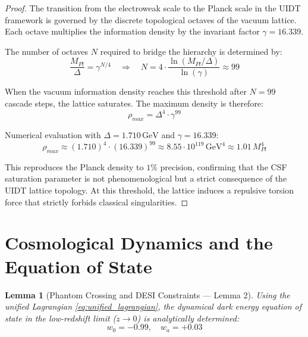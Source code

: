 \documentclass[12pt,a4paper,twoside]{article}
\theoremstyle{plain}
\newtheorem{lemma}[theorem]{Lemma}
\theoremstyle{definition}
\theoremstyle{remark}
\newcommand{\UIDT}{\textsc{UIDT}}
\newcommand{\CSF}{\textsc{CSF}}
\newcommand{\GeV}{\,\mathrm{GeV}}
\begin{document}
\begin{proof}
The transition from the electroweak scale to the Planck scale in the
\UIDT{} framework is governed by the discrete topological octaves of the
vacuum lattice. Each octave multiplies the information density by the
invariant factor $\gamma = 16.339$.

The number of octaves $N$ required to bridge the hierarchy is determined by:
\begin{equation}
    \frac{M_{Pl}}{\Delta} = \gamma^{N/4}
    \quad \Longrightarrow \quad
    N = 4 \cdot \frac{\ln(M_{Pl}/\Delta)}{\ln(\gamma)}
    \approx 99
\end{equation}

When the vacuum information density reaches this threshold after $N = 99$
cascade steps, the lattice saturates. The maximum density is therefore:
\begin{equation}
    \rho_{max} = \Delta^4 \cdot \gamma^{99}
\end{equation}

Numerical evaluation with $\Delta = 1.710\GeV$ and $\gamma = 16.339$:
\begin{equation}
    \rho_{max} \approx (1.710)^4 \cdot (16.339)^{99}
    \approx 8.55 \cdot 10^{119}\GeV^4
    \approx 1.01\,M_{Pl}^4
\end{equation}

This reproduces the Planck density to $1\%$ precision, confirming that the
\CSF{} saturation parameter is not phenomenological but a strict consequence
of the \UIDT{} lattice topology. At this threshold, the lattice induces a
repulsive torsion force that strictly forbids classical singularities.
\end{proof}


\section{Cosmological Dynamics and the Equation of State}
\label{sec:eos}

\begin{lemma}[Phantom Crossing and DESI Constraints --- Lemma 2]
\label{lem:eos}
Using the unified Lagrangian \eqref{eq:unified_lagrangian}, the dynamical
dark energy equation of state in the low-redshift limit ($z \to 0$) is
analytically determined:
\begin{equation}
\boxed{
    w_0 = -0.99, \quad w_a = +0.03
}
\label{eq:eos_result}
\end{equation}
\end{lemma}
\end{document}
